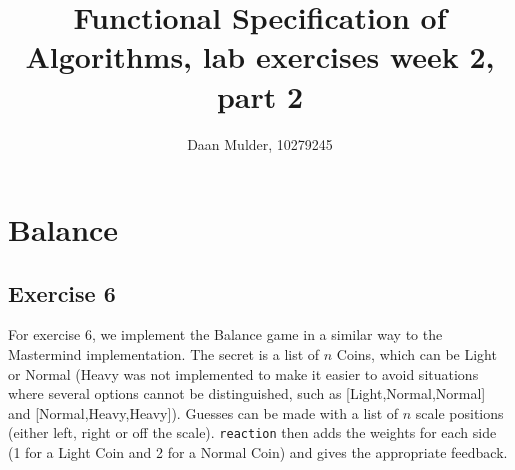 \documentclass[a4paper,12pt]{amsart}
\begin{document}
\title{Functional Specification of Algorithms, lab exercises week 2, part 2}
\author{Daan Mulder, 10279245}
\maketitle

\section*{Balance}

\subsection*{Exercise 6}
For exercise 6, we implement the Balance game in a similar way to the Mastermind implementation. The secret is a list of $n$ Coins, which can be Light or Normal (Heavy was not implemented to make it easier to avoid situations where several options cannot be distinguished, such as [Light,Normal,Normal] and [Normal,Heavy,Heavy]). Guesses can be made with a list of $n$ scale positions (either left, right or off the scale). \texttt{reaction} then adds the weights for each side (1 for a Light Coin and 2 for a Normal Coin) and gives the appropriate feedback.
\end{document}
